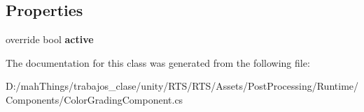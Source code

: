 \subsection*{Properties}
\begin{DoxyCompactItemize}
\item 
\mbox{\label{class_unity_engine_1_1_post_processing_1_1_color_grading_component_acc86c87eda1936a230afa7c7afad7be9}} 
override bool {\bfseries active}
\end{DoxyCompactItemize}


The documentation for this class was generated from the following file\+:\begin{DoxyCompactItemize}
\item 
D\+:/mah\+Things/trabajos\+\_\+clase/unity/\+R\+T\+S/\+R\+T\+S/\+Assets/\+Post\+Processing/\+Runtime/\+Components/Color\+Grading\+Component.\+cs\end{DoxyCompactItemize}
